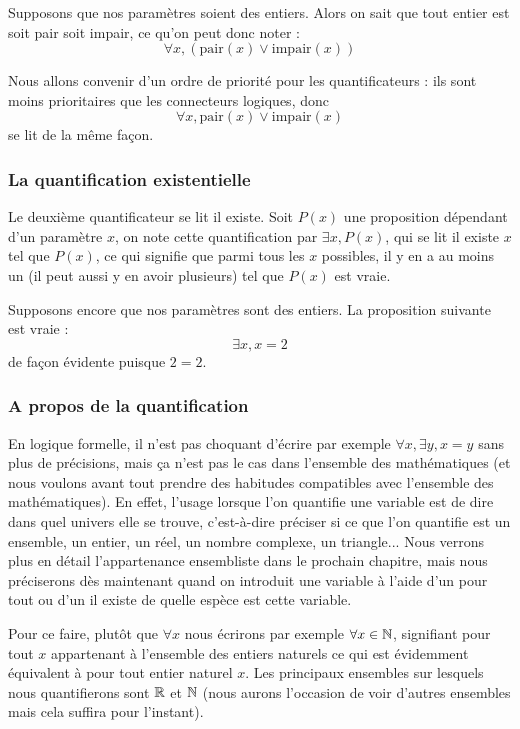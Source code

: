 \begin{expl}
    Supposons que nos paramètres soient des entiers. Alors on sait que tout entier est soit pair soit impair, ce qu'on peut donc noter :
    $$\forall x, (\mathrm{pair}(x)\lor \mathrm{impair}(x))$$
    
    Nous allons convenir d'un ordre de priorité pour les quantificateurs : ils sont moins prioritaires que les connecteurs logiques, donc $$\forall x, \mathrm{pair}(x)\lor \mathrm{impair}(x)$$ se lit de la même façon.
\end{expl}

\subsubsection{La quantification existentielle}

Le deuxième quantificateur se lit \og il existe\fg{}. Soit $P(x)$ une proposition dépendant d'un paramètre $x$, on note cette quantification par $\exists x, P(x)$, qui se lit \og il existe $x$ tel que $P(x)$\fg{}, ce qui signifie que parmi tous les $x$ possibles, il y en a au moins un (il peut aussi y en avoir plusieurs) tel que $P(x)$ est vraie.

\begin{expl}
    Supposons encore que nos paramètres sont des entiers. La proposition suivante est vraie : $$\exists x, x=2$$ de façon évidente puisque $2=2$.
\end{expl}

\subsubsection{A propos de la quantification}

En logique formelle, il n'est pas choquant d'écrire par exemple $\forall x, \exists y, x=y$ sans plus de précisions, mais ça n'est pas le cas dans l'ensemble des mathématiques (et nous voulons avant tout prendre des habitudes compatibles avec l'ensemble des mathématiques). En effet, l'usage lorsque l'on quantifie une variable est de dire dans quel univers elle se trouve, c'est-à-dire préciser si ce que l'on quantifie est un ensemble, un entier, un réel, un nombre complexe, un triangle... Nous verrons plus en détail l'appartenance ensembliste dans le prochain chapitre, mais nous préciserons dès maintenant quand on introduit une variable à l'aide d'un \og pour tout\fg{} ou d'un \og il existe\fg{} de quelle espèce est cette variable.

Pour ce faire, plutôt que $\forall x$ nous écrirons par exemple $\forall x \in \mathbb{N}$, signifiant \og pour tout $x$ appartenant à l'ensemble des entiers naturels\fg{} ce qui est évidemment équivalent à \og pour tout entier naturel $x$\fg{}. Les principaux ensembles sur lesquels nous quantifierons sont $\mathbb{R}$ et $\mathbb{N}$ (nous aurons l'occasion de voir d'autres ensembles mais cela suffira pour l'instant).

